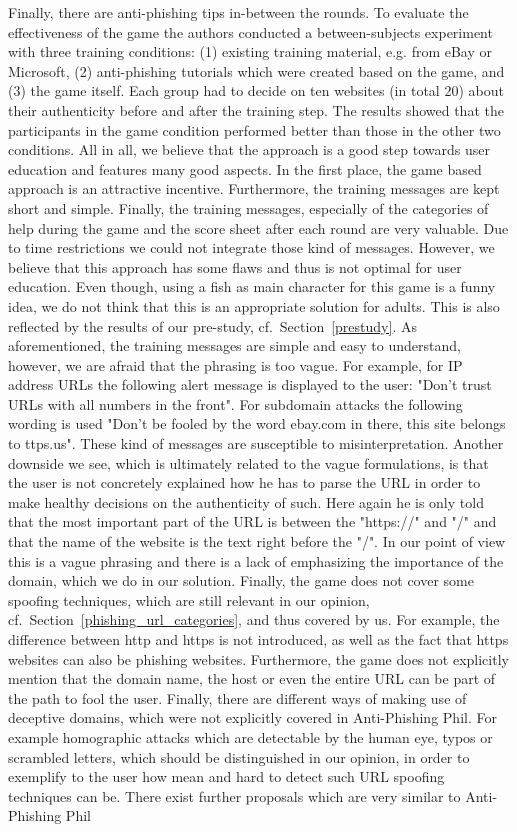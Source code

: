 Finally, there are anti-phishing tips in-between the rounds. 
To evaluate the effectiveness of the game the authors conducted a between-subjects experiment with three training conditions: 
(1) existing training material, e.g. from eBay or Microsoft, (2) anti-phishing tutorials which were created based on the game, and (3) the game itself. 
Each group had to decide on ten websites (in total 20) about their authenticity before and after the training step. 
The results showed that the participants in the game condition performed better than those in the other two conditions. 
All in all, we believe that the approach is a good step towards user education and features many good aspects. 
In the first place, the game based approach is an attractive incentive. 
Furthermore, the training messages are kept short and simple. 
Finally, the training messages, especially of the categories of help during the game and the score sheet after each round are very valuable. 
Due to time restrictions we could not integrate those kind of messages. 
However, we believe that this approach has some flaws and thus is not optimal for user education. 
Even though, using a fish as main character for this game is a funny idea, we do not think that this is an appropriate solution for adults. 
This is also reflected by the results of our pre-study, cf.~Section~\ref{prestudy}. 
As aforementioned, the training messages are simple and easy to understand, however, we are afraid that the phrasing is too vague. 
For example, for IP address URLs the following alert message is displayed to the user: 
"Don't trust URLs with all numbers in the front". 
For subdomain attacks the following wording is used "Don't be fooled by the word ebay.com in there, this site belongs to ttps.us". 
These kind of messages are susceptible to misinterpretation. 
Another downside we see, which is ultimately related to the vague formulations, is that the user is not concretely explained how he has to parse the URL in order to make healthy decisions on the authenticity of such. 
Here again he is only told that the most important part of the URL is between the "https://" and "/" and that the name of the website is the text right before the "/". 
In our point of view this is a vague phrasing and there is a lack of emphasizing the importance of the domain, which we do in our solution. 
Finally, the game does not cover some spoofing techniques, which are still relevant in our opinion, cf.~Section~\ref{phishing_url_categories}, and thus covered by us. 
For example, the difference between http and https is not introduced, as well as the fact that https websites can also be phishing websites. 
Furthermore, the game does not explicitly mention that the domain name, the host or even the entire URL can be part of the path to fool the user. 
Finally, there are different ways of making use of deceptive domains, which were not explicitly covered in Anti-Phishing Phil. 
For example homographic attacks which are detectable by the human eye, typos or scrambled letters, which should be distinguished in our opinion, in order to exemplify to the user how mean and hard to detect such URL spoofing techniques can be. 
There exist further proposals which are very similar to Anti-Phishing Phil~\cite{arachchilage2011designing,arachchilage2012designing}

